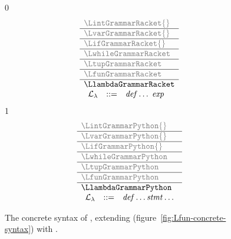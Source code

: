 \documentclass[7x10]{TimesAPriori_MIT}%
\newcommand{\gray}[1]{{\color{gray} #1}}
\def\racketEd{0}
\def\pythonEd{1}
\def\edition{1}
\newcommand{\pythonColor}[0]{}
\numberwithin{theorem}{chapter}
\numberwithin{definition}{chapter}
\numberwithin{equation}{chapter}
\begin{document}

\begin{figure}[tp]
\centering
\begin{tcolorbox}[colback=white]
    \small
{\if\edition\racketEd
\[
\begin{array}{l}
  \gray{\LintGrammarRacket{}} \\ \hline
  \gray{\LvarGrammarRacket{}} \\ \hline
  \gray{\LifGrammarRacket{}} \\ \hline
  \gray{\LwhileGrammarRacket} \\ \hline
  \gray{\LtupGrammarRacket} \\   \hline
  \gray{\LfunGrammarRacket} \\   \hline
  \LlambdaGrammarRacket \\
  \begin{array}{lcl}
  \LangLamM{} &::=& \Def\ldots \; \Exp
  \end{array}
\end{array}
\]
\fi}
{\if\edition\pythonEd\pythonColor
\[
\begin{array}{l}
  \gray{\LintGrammarPython{}} \\ \hline
  \gray{\LvarGrammarPython{}} \\ \hline
  \gray{\LifGrammarPython{}} \\ \hline
  \gray{\LwhileGrammarPython} \\ \hline
  \gray{\LtupGrammarPython} \\   \hline
  \gray{\LfunGrammarPython} \\   \hline
  \LlambdaGrammarPython \\
  \begin{array}{lcl}
    \LangLamM{} &::=& \Def\ldots \Stmt\ldots
  \end{array}
\end{array}
\]
\fi}
\end{tcolorbox}
\caption{The concrete syntax of \LangLam{}, extending \LangFun{} (figure~\ref{fig:Lfun-concrete-syntax}) 
  with .}
\label{fig:Llam-concrete-syntax}
\end{figure}
\end{document}
